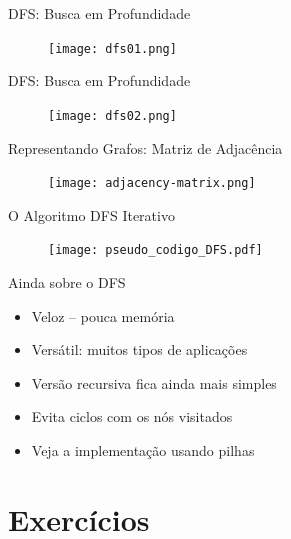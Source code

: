 \begin{frame}[c]{DFS: Busca em Profundidade} 

		   	\begin{figure}[!htpb]
				\centering
				\texttt{[image: dfs01.png]}
			\end{figure} 
\end{frame}



\begin{frame}[c]{DFS: Busca em Profundidade} 

		   	\begin{figure}[!htpb]
				\centering
				\texttt{[image: dfs02.png]}
			\end{figure} 
\end{frame}


\begin{frame}[c]{Representando Grafos: Matriz de Adjacência} 

		   	\begin{figure}[!htpb]
				\centering
				\texttt{[image: adjacency-matrix.png]}
			\end{figure} 
\end{frame}


\begin{frame}[c]{O Algoritmo DFS Iterativo} 

		   	\begin{figure}[!htpb]
				\centering
				\texttt{[image: pseudo\_codigo\_DFS.pdf]}
			\end{figure} 
\end{frame}


\begin{frame}[c]{Ainda sobre o DFS} 

\begin{itemize}
  \item Veloz -- pouca memória
  \item Versátil: muitos tipos de aplicações
  \item Versão recursiva fica ainda mais simples
  \item Evita ciclos com os nós visitados 
  \item Veja a implementação usando pilhas
  
\end{itemize}

\end{frame}

\section{Exercícios}

